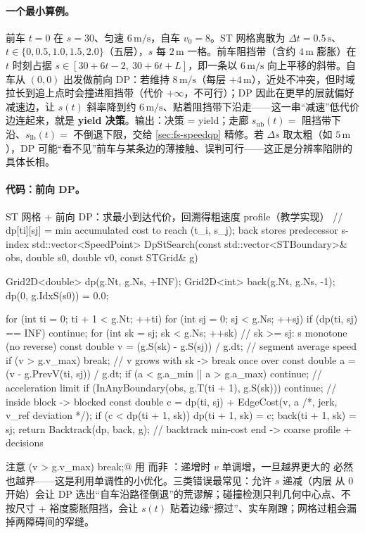\paragraph{一个最小算例。}
前车 $t{=}0$ 在 $s{=}30$、匀速 $6\,\mathrm{m/s}$，自车 $v_0=8$。ST 网格离散为 $\Delta t=0.5\,\mathrm{s}$、$t\in\{0,0.5,1.0,1.5,2.0\}$（五层），$s$ 每 $2\,\mathrm{m}$ 一格。前车阻挡带（含约 $4\,\mathrm{m}$ 膨胀）在 $t$ 时刻占据 $s\in[30+6t-2,\ 30+6t+L]$，即一条以 $6\,\mathrm{m/s}$ 向上平移的斜带。自车从 $(0,0)$ 出发做前向 DP：若维持 $8\,\mathrm{m/s}$（每层 $+4\,\mathrm{m}$），近处不冲突，但时域拉长到追上点时会撞进阻挡带（代价 $+\infty$，不可行）；DP 因此在更早的层就偏好减速边，让 $s(t)$ 斜率降到约 $6\,\mathrm{m/s}$、贴着阻挡带下沿走——这一串“减速”低代价边连起来，就是 \textbf{yield 决策}。输出：决策 = yield；走廊 $s_{\mathrm{ub}}(t)=$ 阻挡带下沿、$s_{\mathrm{lb}}(t)=$ 不倒退下限，交给 \cref{sec:fs-speedqp} 精修。若 $\Delta s$ 取太粗（如 $5\,\mathrm{m}$），DP 可能“看不见”前车与某条边的薄接触、误判可行——这正是分辨率陷阱的具体长相。

\paragraph{代码：前向 DP。}
\begin{codebox}[C++]{ST 网格 + 前向 DP：求最小到达代价，回溯得粗速度 profile（教学实现）}
// dp[ti][sj] = min accumulated cost to reach (t_i, s_j); back stores predecessor s-index
std::vector<SpeedPoint> DpStSearch(const std::vector<STBoundary>& obs,
                                   double s0, double v0, const STGrid& g) {
  Grid2D<double> dp(g.Nt, g.Ns, +INF);
  Grid2D<int>    back(g.Nt, g.Ns, -1);
  dp(0, g.IdxS(s0)) = 0.0;

  for (int ti = 0; ti + 1 < g.Nt; ++ti) {
    for (int sj = 0; sj < g.Ns; ++sj) {
      if (dp(ti, sj) == INF) continue;
      for (int sk = sj; sk < g.Ns; ++sk) {            // sk >= sj: s monotone (no reverse)
        const double v = (g.S(sk) - g.S(sj)) / g.dt;  // segment average speed
        if (v > g.v_max) break;                       // v grows with sk -> break once over
        const double a = (v - g.PrevV(ti, sj)) / g.dt;
        if (a < g.a_min || a > g.a_max) continue;     // acceleration limit
        if (InAnyBoundary(obs, g.T(ti + 1), g.S(sk))) continue;  // inside block -> blocked
        const double c = dp(ti, sj) + EdgeCost(v, a /*, jerk, v_ref deviation */);
        if (c < dp(ti + 1, sk)) { dp(ti + 1, sk) = c; back(ti + 1, sk) = sj; }
      }
    }
  }
  return Backtrack(dp, back, g);  // backtrack min-cost end -> coarse profile + decisions
}
\end{codebox}
注意 \verb@if (v > g.v_max) break;@ 用 \verb@break@ 而非 \verb@continue@：\verb@sk@ 递增时 $v$ 单调增，一旦越界更大的 \verb@sk@ 必然也越界——这是利用单调性的小优化。三类错误最常见：允许 $s$ 递减（内层 \verb@sk@ 从 $0$ 开始）会让 DP 选出“自车沿路径倒退”的荒谬解；碰撞检测只判几何中心点、不按尺寸 + 裕度膨胀阻挡，会让 $s(t)$ 贴着边缘“擦过”、实车剐蹭；网格过粗会漏掉两障碍间的窄缝。

